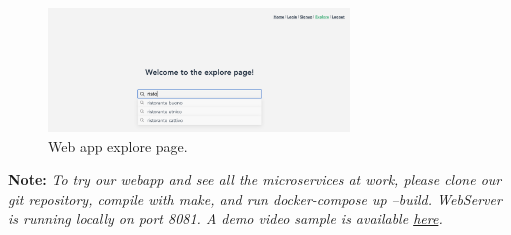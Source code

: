 \vspace{0.5in}

\begin{figure}[H]
    \begin{center}
        \includegraphics[width=8cm]{./images/explore_page.png}
    \end{center}
    \caption{Web app explore page.}
    \label{fig:explore_page}
\end{figure}

%

\textbf{Note: }\textit{ To try our webapp and see all the microservices at work, please clone our git repository, compile with make, and run docker-compose up --build. WebServer is running locally on port 8081. A demo video sample is available \href{https://www.youtube.com/watch?v=2iVW3yifJOw}{here}.} \clearpage

